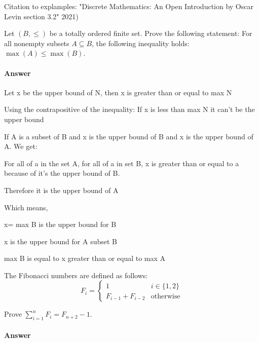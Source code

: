 \documentclass{article}
\begin{document}
{Citation to explamples: "Discrete Mathematics: An Open Introduction by Oscar Levin section 3.2" 2021)


 

Let $(B,\leq)$ be a totally ordered finite set. Prove the following
statement: For all nonempty subsets $A \subseteq B$, the following inequality
holds: $\max(A) \leq \max(B)$.

\paragraph{Answer}

{Let x be the upper bound of N, then x is greater than or equal to max N}

{Using the contrapositive of the inequality: If x is less than max N it can't be the upper bound}

{If A is a subset of B and x is the upper bound of B and x is the upper bound of A. We get:}

{For all of a in the set A, for all of a in set B, x is greater than or equal to a because of it's the upper bound of B.}

{Therefore it is the upper bound of A}


{Which means,}


{x= max B is the upper bound for B}

{x is the upper bound for A subset B}

{max B is equal to x greater than or equal to max A}

 

The Fibonacci numbers are defined as follows:
$$
    F_i = \begin{cases}
            1 & i \in \{1,2\} \\
            F_{i-1}+F_{i-2} & \text{otherwise}
          \end{cases}
$$

Prove $\sum_{i=1}^n F_i = F_{n+2}-1$.

\paragraph{Answer}

}
\end{document}
